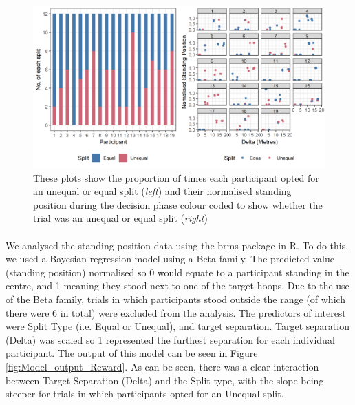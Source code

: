 \documentclass[12pt]{article}
\begin{document}
\begin{figure}[ht!]%
	\includegraphics[scale=0.9]{Figures/Experiment_5_Unequal_Reward/prop_and_position}
	\centering
	\captionsetup{justification=centering}
	\caption{These plots show the proportion of times each participant opted for an unequal or equal split (\textit{left}) and their normalised standing position during the decision phase colour coded to show whether the trial was an unequal or equal split (\textit{right})}
	\label{fig:DecisionPhase_Reward}
\end{figure}

\paragraph{} We analysed the standing position data using the brms package \citep{brms2017,brms2018} in R. To do this, we used a Bayesian regression model using a Beta family. The predicted value (standing position) normalised so 0 would equate to a participant standing in the centre, and 1 meaning they stood next to one of the target hoops. Due to the use of the Beta family, trials in which participants stood outside the range (of which there were 6 in total) were excluded from the analysis. The predictors of interest were Split Type (i.e. Equal or Unequal), and target separation. Target separation (Delta) was scaled so 1 represented the furthest separation for each individual participant. The output of this model can be seen in Figure \ref{fig:Model_output_Reward}. As can be seen, there was a clear interaction between Target Separation (Delta) and the Split type, with the slope being steeper for trials in which participants opted for an Unequal split. 
\end{document}
